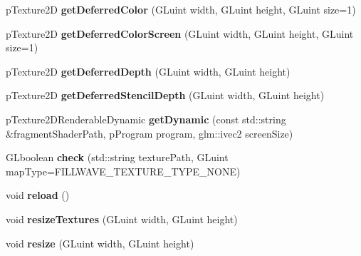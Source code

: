 \begin{DoxyCompactItemize}
\item 
\hypertarget{classfillwave_1_1manager_1_1TextureManager_ae977db54b989232c0c11c9e990a7b2cc}{}p\+Texture2\+D {\bfseries get\+Deferred\+Color} (G\+Luint width, G\+Luint height, G\+Luint size=1)\label{classfillwave_1_1manager_1_1TextureManager_ae977db54b989232c0c11c9e990a7b2cc}

\item 
\hypertarget{classfillwave_1_1manager_1_1TextureManager_a70b8f4eea4d9581b729fe719ba0eb051}{}p\+Texture2\+D {\bfseries get\+Deferred\+Color\+Screen} (G\+Luint width, G\+Luint height, G\+Luint size=1)\label{classfillwave_1_1manager_1_1TextureManager_a70b8f4eea4d9581b729fe719ba0eb051}

\item 
\hypertarget{classfillwave_1_1manager_1_1TextureManager_a6268124bb3f4c9e2d36a1a9d67fe6a0b}{}p\+Texture2\+D {\bfseries get\+Deferred\+Depth} (G\+Luint width, G\+Luint height)\label{classfillwave_1_1manager_1_1TextureManager_a6268124bb3f4c9e2d36a1a9d67fe6a0b}

\item 
\hypertarget{classfillwave_1_1manager_1_1TextureManager_a015dc2fd80bb933d0edd820bab853d06}{}p\+Texture2\+D {\bfseries get\+Deferred\+Stencil\+Depth} (G\+Luint width, G\+Luint height)\label{classfillwave_1_1manager_1_1TextureManager_a015dc2fd80bb933d0edd820bab853d06}

\item 
\hypertarget{classfillwave_1_1manager_1_1TextureManager_a9e4a6ecb64d5f9dd28414e9c8fe62d06}{}p\+Texture2\+D\+Renderable\+Dynamic {\bfseries get\+Dynamic} (const std\+::string \&fragment\+Shader\+Path, p\+Program program, glm\+::ivec2 screen\+Size)\label{classfillwave_1_1manager_1_1TextureManager_a9e4a6ecb64d5f9dd28414e9c8fe62d06}

\item 
\hypertarget{classfillwave_1_1manager_1_1TextureManager_a29f3d2bc108af5de03d3c74e23fab814}{}G\+Lboolean {\bfseries check} (std\+::string texture\+Path, G\+Luint map\+Type=F\+I\+L\+L\+W\+A\+V\+E\+\_\+\+T\+E\+X\+T\+U\+R\+E\+\_\+\+T\+Y\+P\+E\+\_\+\+N\+O\+N\+E)\label{classfillwave_1_1manager_1_1TextureManager_a29f3d2bc108af5de03d3c74e23fab814}

\item 
\hypertarget{classfillwave_1_1manager_1_1TextureManager_a26599576d6340b67b57e580d96d4ad2c}{}void {\bfseries reload} ()\label{classfillwave_1_1manager_1_1TextureManager_a26599576d6340b67b57e580d96d4ad2c}

\item 
\hypertarget{classfillwave_1_1manager_1_1TextureManager_a33918d6cd7e4b8d7bf152c5ae46aede5}{}void {\bfseries resize\+Textures} (G\+Luint width, G\+Luint height)\label{classfillwave_1_1manager_1_1TextureManager_a33918d6cd7e4b8d7bf152c5ae46aede5}

\item 
\hypertarget{classfillwave_1_1manager_1_1TextureManager_a34a7683620dc1d60fdd8a5523d28447d}{}void {\bfseries resize} (G\+Luint width, G\+Luint height)\label{classfillwave_1_1manager_1_1TextureManager_a34a7683620dc1d60fdd8a5523d28447d}

\end{DoxyCompactItemize}


